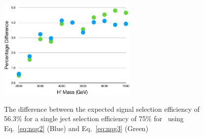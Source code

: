 \begin{figure}[p]
 \centering
 {\includegraphics[width=0.60\textwidth]{figures/tagging/HPrime_Efficiency_Difference}}

\caption{ The difference between the expected signal selection efficiency of 56.3\%
for a single ject selection efficiency of 75\% for \Hprime\ using  Eq.~\ref{eq:nqg2} (Blue) and
Eq.~\ref{eq:nqg3} (Green)
 \label{fig:HPrime_efficiency_difference}}
\end{figure}



\clearpage

